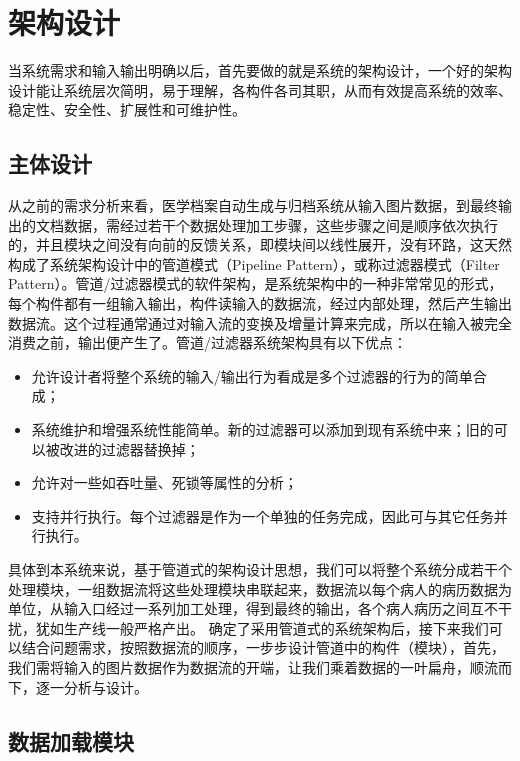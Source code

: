 \chapter{架构设计}
\label{chap:system-framework}
当系统需求和输入输出明确以后，首先要做的就是系统的架构设计，一个好的架构设计能让系统层次简明，易于理解，各构件各司其职，从而有效提高系统的效率、稳定性、安全性、扩展性和可维护性。

\section{主体设计}
从之前的需求分析来看，医学档案自动生成与归档系统从输入图片数据，到最终输出的文档数据，需经过若干个数据处理加工步骤，这些步骤之间是顺序依次执行的，并且模块之间没有向前的反馈关系，即模块间以线性展开，没有环路，这天然构成了系统架构设计中的管道模式（Pipeline Pattern），或称过滤器模式（Filter Pattern）。管道/过滤器模式的软件架构，是系统架构中的一种非常常见的形式，每个构件都有一组输入输出，构件读输入的数据流，经过内部处理，然后产生输出数据流。这个过程通常通过对输入流的变换及增量计算来完成，所以在输入被完全消费之前，输出便产生了。管道/过滤器系统架构具有以下优点：
\begin{itemize}
	\item 允许设计者将整个系统的输入/输出行为看成是多个过滤器的行为的简单合成；
	\item 系统维护和增强系统性能简单。新的过滤器可以添加到现有系统中来；旧的可以被改进的过滤器替换掉；
	\item 允许对一些如吞吐量、死锁等属性的分析；
	\item 支持并行执行。每个过滤器是作为一个单独的任务完成，因此可与其它任务并行执行。
\end{itemize}
具体到本系统来说，基于管道式的架构设计思想，我们可以将整个系统分成若干个处理模块，一组数据流将这些处理模块串联起来，数据流以每个病人的病历数据为单位，从输入口经过一系列加工处理，得到最终的输出，各个病人病历之间互不干扰，犹如生产线一般严格产出。
确定了采用管道式的系统架构后，接下来我们可以结合问题需求，按照数据流的顺序，一步步设计管道中的构件（模块），首先，我们需将输入的图片数据作为数据流的开端，让我们乘着数据的一叶扁舟，顺流而下，逐一分析与设计。

\section{数据加载模块}

